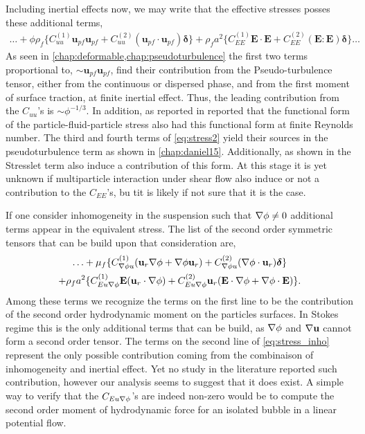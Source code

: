 Including inertial effects now, we may write that the effective stresses posses these additional terms,
\begin{multline}
    \ldots
    +\phi \rho_f \{ C_{uu}^{(1)}
    \textbf{u}_{pf}\textbf{u}_{pf} 
    + C_{uu}^{(2)} (\textbf{u}_{pf}\cdot \textbf{u}_{pf}) \bm\delta \}
    + 
    \rho_f a^2 \{ C_{EE}^{(1)} \textbf{E}\cdot \textbf{E}
    +  C_{EE}^{(2)} (\textbf{E} : \textbf{E})\bm\delta \}
    \ldots
    \label{eq:stress2}
\end{multline}
As seen in \ref{chap:deformable,chap:pseudoturbulence} the first two terms proportional to, $\sim \textbf{u}_{pf}\textbf{u}_{pf}$, find their contribution from the Pseudo-turbulence tensor, either from the continuous or dispersed phase, and from the first moment of surface traction, at finite inertial effect. 
Thus, the leading contribution from the $C_{uu}$'s is $\sim \phi^{-1/3}$. 
In addition, as reported in \citet{zhang2021stress} reported that the functional form of the particle-fluid-particle stress also had this functional form at finite Reynolds number. 
The third and fourth terms of \ref{eq:stress2} yield their sources in the pseudoturbulence term as shown in \ref{chap:daniel15}. 
Additionally, as shown in \citet{stone2001inertial} the Stresslet term also induce a contribution of this form. 
At this stage it is yet unknown if multiparticle interaction under shear flow also induce or not a contribution to the $C_{EE}$'s, bu tit is likely if not sure that it is the case. 

If one consider inhomogeneity in the suspension such that $\mathbf{\nabla} \phi \neq 0$ additional terms appear in the equivalent stress.  
The list of the second order symmetric tensors that can be build upon that consideration are, 
\begin{multline}
    \ldots 
    +  \mu_f \{
    C_{\grad \phi u}^{(1)}
    (\textbf{u}_{r}
    \grad \phi 
    + 
    \grad \phi 
    \textbf{u}_{r}) 
    +C_{\grad \phi u}^{(2)} (\grad \phi \cdot 
    \textbf{u}_{r})\bm\delta \}\\
    +\rho_f a^2 \{
    C_{Eu \grad \phi}^{(1)} \textbf{E} (\textbf{u}_r\cdot \grad \phi) 
    + C_{Eu \grad \phi}^{(2)}  \textbf{u}_r (\textbf{E}\cdot\grad \phi+ \grad \phi\cdot \textbf{E})
    \}.
    \label{eq:stress_inho}
\end{multline}
Among these terms we recognize the terms on the first line to be the contribution of the second order hydrodynamic moment on the particles surfaces. 
In Stokes regime this is the only additional terms that can be build, as $\mathbf{\nabla} \phi$ and $\mathbf{\nabla} \textbf{u}$ cannot form a second order tensor. 
The terms on the second line of \ref{eq:stress_inho} represent the only possible contribution coming from the combinaison of inhomogeneity and inertial effect. 
Yet no study in the literature reported such contribution, however our analysis seems to suggest that it does exist.
A simple way to verify that the $C_{Eu \mathbf{\nabla} \phi}$'s are indeed non-zero would be to compute the second order moment of hydrodynamic force for an isolated bubble in a linear potential flow. 

